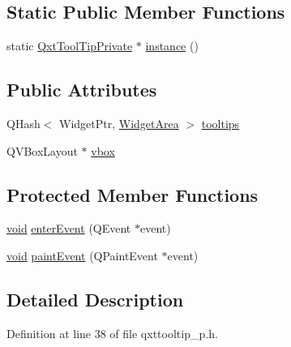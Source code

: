 \subsection*{Static Public Member Functions}
\begin{DoxyCompactItemize}
\item 
static \hyperlink{class_qxt_tool_tip_private}{Qxt\-Tool\-Tip\-Private} $\ast$ \hyperlink{class_qxt_tool_tip_private_ae742b8daf031b1bfdf77171a94769fd0}{instance} ()
\end{DoxyCompactItemize}
\subsection*{Public Attributes}
\begin{DoxyCompactItemize}
\item 
Q\-Hash$<$ Widget\-Ptr, \hyperlink{qxttooltip__p_8h_a5058137eca5bf55623fab12642b206a6}{Widget\-Area} $>$ \hyperlink{class_qxt_tool_tip_private_a1be47192f9629c78d6aa78054f8cfb4e}{tooltips}
\item 
Q\-V\-Box\-Layout $\ast$ \hyperlink{class_qxt_tool_tip_private_a2f97cfa21338d191e26862f0409813f0}{vbox}
\end{DoxyCompactItemize}
\subsection*{Protected Member Functions}
\begin{DoxyCompactItemize}
\item 
\hyperlink{group___u_a_v_objects_plugin_ga444cf2ff3f0ecbe028adce838d373f5c}{void} \hyperlink{class_qxt_tool_tip_private_a4c46e0920dc065600cb7813ae0983de1}{enter\-Event} (Q\-Event $\ast$event)
\item 
\hyperlink{group___u_a_v_objects_plugin_ga444cf2ff3f0ecbe028adce838d373f5c}{void} \hyperlink{class_qxt_tool_tip_private_a445350890b4bda815171d474504d17b3}{paint\-Event} (Q\-Paint\-Event $\ast$event)
\end{DoxyCompactItemize}


\subsection{Detailed Description}


Definition at line 38 of file qxttooltip\-\_\-p.\-h.




